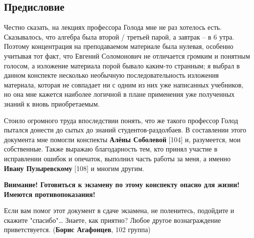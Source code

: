 \subsection*{Предисловие}
 
 Честно сказать, на лекциях профессора Голода мне не раз хотелось
 есть. Сказывалось, что алгебра была второй / третьей парой, а
 завтрак -- в 6 утра. Поэтому концентрация на преподаваемом материале
 была нулевая, особенно учитывая тот факт, что Евгений Соломонович не
 отличается громким и понятным голосом, а изложение материала порой
 бывало каким-то странным; я выбрал в данном конспекте несколько
 необычную последовательность изложения материала, которая не
 совпадает ни с одним из них уже написанных учебников, но она мне
 кажется наиболее логичной в плане применения уже полученных знаний к
 вновь приобретаемым.
 
 Стоило огромного труда впоследствии понять, что же такого профессор
 Голод пытался донести до сытых до знаний студентов-раздолбаев. В
 составлении этого документа мне помогли конспекты {\bfseries Алёны
 Соболевой} [104] и, разумеется, мои собственные. Также выражаю
 благодарность тем, кто принял участие в исправлении ошибок и
 опечаток, выполнил часть работы за меня, а именно {\bfseries Ивану
 Пузыревскому} [108] и многим другим.



\begin{petit}

{\color{red}\bf Внимание! Готовиться к экзамену по этому конспекту опасно
  для жизни! Имеются противопоказания!}

\end{petit} 


\begin{petit}
Если вам помог этот документ в сдаче экзамена, не поленитесь, подойдите и скажите "спасибо"\ldots
Знаете, как приятно? Любое другое вознаграждение приветствуется.
({\bfseries Борис Агафонцев}, 102 группа)
\end{petit}
 
 
